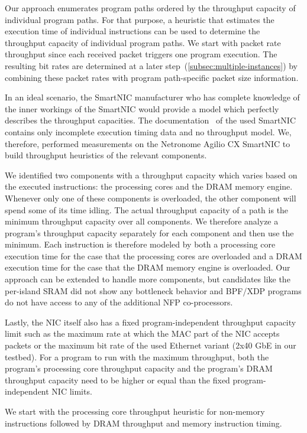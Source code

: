 \documentclass[10pt,letterpaper,sigconf,anonymous,nonacm,screen]{acmart}
\begin{document}
Our approach enumerates program paths ordered by the throughput capacity of individual program paths.
For that purpose, a heuristic that estimates the execution time of individual instructions can be used to determine the throughput capacity of individual program paths.
We start with packet rate throughput since each received packet triggers one program execution.
The resulting bit rates are determined at a later step~(\ref{subsec:multiple-instances}) by combining these packet rates with program path-specific packet size information.

In an ideal scenario, the SmartNIC manufacturer who has complete knowledge of the inner workings of the SmartNIC would provide a model which perfectly describes the throughput capacities.
The documentation~\cite{reference-manual,joy-of-micro-c} of the used SmartNIC contains only incomplete execution timing data and no throughput model.
We, therefore, performed measurements on the Netronome Agilio CX SmartNIC to build throughput heuristics of the relevant components.

We identified two components with a throughput capacity which varies based on the executed instructions: the processing cores and the DRAM memory engine.
Whenever only one of these components is overloaded, the other component will spend some of its time idling.
The actual throughput capacity of a path is the minimum throughput capacity over all components.
We therefore analyze a program's throughput capacity separately for each component and then use the minimum.
Each instruction is therefore modeled by both a processing core execution time for the case that the processing cores are overloaded and a DRAM execution time for the case that the DRAM memory engine is overloaded.
Our approach can be extended to handle more components, but candidates like the per-island SRAM did not show any bottleneck behavior and BPF/XDP programs do not have access to any of the additional NFP co-processors.

Lastly, the NIC itself also has a fixed program-independent throughput capacity limit such as the maximum rate at which the MAC part of the NIC accepts packets or the maximum bit rate of the used Ethernet variant (2x40 GbE in our testbed).
For a program to run with the maximum throughput, both the program's processing core throughput capacity and the program's DRAM throughput capacity need to be higher or equal than the fixed program-independent NIC limits.

We start with the processing core throughput heuristic for non-memory instructions followed by DRAM throughput and memory instruction timing.
\end{document}
